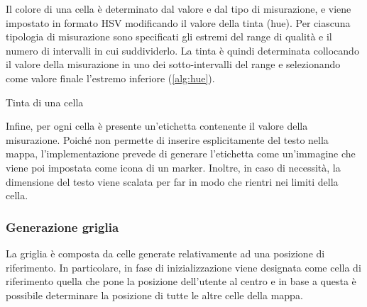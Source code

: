 Il colore di una cella è determinato dal valore e dal tipo di misurazione, e viene impostato in formato HSV modificando il valore della tinta (hue).
Per ciascuna tipologia di misurazione sono specificati gli estremi del range di qualità e il numero di intervalli in cui suddividerlo.
La tinta è quindi determinata collocando il valore della misurazione in uno dei sotto-intervalli del range e selezionando come valore finale l'estremo inferiore (\cref{alg:hue}).

\begin{algorithm}[H]
  \caption{Tinta di una cella}\label{alg:hue}
  \SetAlgoLined
\end{algorithm}

Infine, per ogni cella è presente un'etichetta contenente il valore della misurazione. Poiché \gmaps{} non permette di inserire esplicitamente del testo nella mappa, l'implementazione prevede di generare l'etichetta come un'immagine che viene poi impostata come icona di un marker. Inoltre, in caso di necessità, la dimensione del testo viene scalata per far in modo che rientri nei limiti della cella.


\subsubsection{Generazione griglia}
La griglia è composta da celle generate relativamente ad una posizione di riferimento. In particolare, in fase di inizializzazione viene designata come cella di riferimento quella che pone la posizione dell'utente al centro e in base a questa è possibile determinare la posizione di tutte le altre celle della mappa. 

